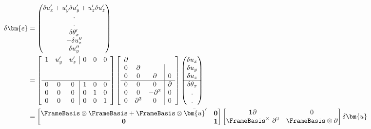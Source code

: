 $$
\begin{aligned}
\delta \bm{e} 
&= \begin{pmatrix}
  \delta u_x^{\prime } + u_y^{\prime} \delta u_y^{\prime} + u_z^{\prime} \delta u_z^{\prime}  \\
. \\
. \\
  \delta \theta_x^{\prime} \\
- \delta u_z^{\prime\prime} \\
  \delta u_y^{\prime\prime} \\
\end{pmatrix} \\
&= \left[\begin{array}{ccc|ccc}
1 & u_y^{\prime} & u_z^{\prime}  & 0 & 0 & 0 \\
\\
\\ \hline
0 & 0 & 0 & 1 & 0 & 0 \\
0 & 0 & 0 & 0 & 1 & 0 \\
0 & 0 & 0 & 0 & 0 & 1 
\end{array}\right]
\left[\begin{array}{ccc|ccc}
\partial & \\
0 & \partial & \\
0 & 0 & \partial & 0 \\ \hline 
0 & 0 & 0 & \partial \\
0 & 0 & -\partial^2 & 0 \\
0 & \partial^2 & 0 & 0 \\
\end{array}\right]
\begin{pmatrix}
\delta u_x \\
\delta u_y \\
\delta u_z \\ \hline
\delta \theta_x \\
. \\
.
\end{pmatrix} \\
&= \begin{bmatrix}
\FrameBasis \otimes\FrameBasis  + \FrameBasis \otimes\bar{\bm{u}}^{\prime} & \mathbf{0} \\
\mathbf{0} & \mathbf{1}
\end{bmatrix}
\begin{bmatrix}
\mathbf{1}\partial & 0 \\
\FrameBasis^{\times}~\partial^2 & \FrameBasis \otimes\partial
\end{bmatrix}
\delta\bm{u}
\end{aligned}
$$


